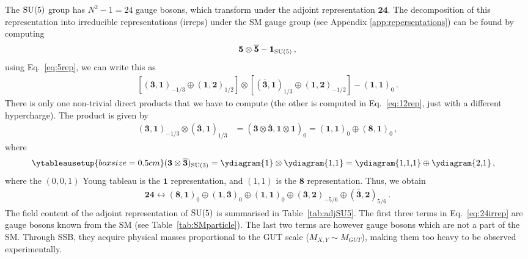 The $\mathrm{SU}(5)$ group has $N^2-1=24$ gauge bosons, which transform under the adjoint representation $\mathbf{24}$. The decomposition of this representation into irreducible representations (irreps) under the SM gauge group (see Appendix \ref{app:repersentations}) can be found by computing
\begin{align}
    \mathbf{5} \otimes \overline{\mathbf{5}} - \mathbf{1}_{\mathrm{SU}(5)} \,,
\end{align}
using Eq.~\eqref{eq:5rep}, we can write this as 
\begin{align}
    \left[ (\mathbf{3},\mathbf{1})_{-1/3} \oplus (\mathbf{1},\mathbf{2})_{1/2} \right] \otimes \left[ (\overline{\mathbf{3}},\mathbf{1})_{1/3} \oplus (\mathbf{1},\mathbf{2})_{-1/2} \right] - (\mathbf{1},\mathbf{1})_0 \,.
\end{align}
There is only one non-trivial direct products that we have to compute (the other is computed in Eq.~\eqref{eq:12rep}, just with a different hypercharge). The product is given by
\begin{align}
    (\mathbf{3},\mathbf{1})_{-1/3} \otimes (\overline{\mathbf{3}},\mathbf{1})_{1/3} &= (\mathbf{3} \otimes \overline{\mathbf{3}}, \mathbf{1} \otimes \mathbf{1})_0 = (\mathbf{1},\mathbf{1})_0 \oplus (\mathbf{8},\mathbf{1})_0 \,,
\end{align}
where
\begin{align}
    \ytableausetup{boxsize=0.5cm}
    (\mathbf{3} \otimes \overline{\mathbf{3}})_{\text{SU}(3)} &= \vcenter{\hbox{\ydiagram{1}}} \otimes \vcenter{\hbox{\ydiagram{1,1}}} = \vcenter{\hbox{\ydiagram{1,1,1}}} \oplus \vcenter{\hbox{\ydiagram{2,1}}} \,,
\end{align}
where the $(0,0,1)$ Young tableau is the $\mathbf{1}$ representation, and $(1,1)$ is the $\mathbf{8}$ representation. Thus, we obtain
\begin{align}
    \mathbf{24} \leftrightarrow (\mathbf{8},\mathbf{1})_0 \oplus (\mathbf{1},\mathbf{3})_0 \oplus (\mathbf{1},\mathbf{1})_0 \oplus (\mathbf{3},\mathbf{2})_{-5/6} \oplus (\overline{\mathbf{3}},\mathbf{2})_{5/6} \,. \label{eq:24irrep}
\end{align}
The field content of the adjoint representation of $\mathrm{SU}(5)$ is summarised in Table~\ref{tab:adjSU5}. The first three terms in Eq.~\eqref{eq:24irrep} are gauge bosons known from the SM (see Table~\ref{tab:SMparticle}). The last two terms are however gauge bosons which are not a part of the SM. Through SSB, they acquire physical masses proportional to the GUT scale ($M_{X,Y}\sim M_{GUT}$), making them too heavy to be observed experimentally.
